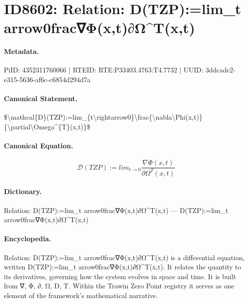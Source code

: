 \section*{ID8602: Relation: D(TZP):=lim\_t arrow0frac∇Φ(x,t)∂Ω\textasciicircum{}T(x,t)}
\paragraph{Metadata.}
PiID: 4352311760066 | RTEID: RTE:P33403.4763:T4.7732 | UUID: 3ddcade2-e315-5636-af6c-c6854d294d7a

\paragraph{Canonical Statement.}
\$\textbackslash{}mathcal\{D\}(TZP):=lim\_\{t\textbackslash{}rightarrow0\}\textbackslash{}frac\{\textbackslash{}nabla\textbackslash{}Phi(x,t)\}\{\textbackslash{}partial\textbackslash{}Omega\textasciicircum{}\{T\}(x,t)\}\$

\paragraph{Canonical Equation.}
\[
\mathcal{D}(TZP):=lim_{t\rightarrow0}\frac{\nabla\Phi(x,t)}{\partial\Omega^{T}(x,t)}
\]

\paragraph{Dictionary.}
Relation: D(TZP):=lim\_t arrow0frac∇Φ(x,t)∂Ω\textasciicircum{}T(x,t) — D(TZP):=lim\_t arrow0frac∇Φ(x,t)∂Ω\textasciicircum{}T(x,t)

\paragraph{Encyclopedia.}
Relation: D(TZP):=lim\_t arrow0frac∇Φ(x,t)∂Ω\textasciicircum{}T(x,t) is a differential equation, written D(TZP):=lim\_t arrow0frac∇Φ(x,t)∂Ω\textasciicircum{}T(x,t). It relates the quantity to its derivatives, governing how the system evolves in space and time. It is built from ∇, Φ, ∂, Ω, D, T. Within the Trawin Zero Point registry it serves as one element of the framework's mathematical narrative.
